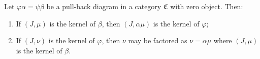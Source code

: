 Let $\varphi \alpha = \psi \beta$ be a pull-back diagram in a category $\mathfrak{C}$ with zero object. Then:
\begin{enumerate}
\item[(i)] If $(J, \mu)$ is the kernel of $\beta$, then $(J, \alpha\mu)$ is the kernel of $\varphi$;
\item[(ii)] If $(J, \nu)$ is the kernel of $\varphi$, then $\nu$ may be factored as $\nu = \alpha\mu$ where $(J, \mu)$ is the kernel of $\beta$.
\end{enumerate}
